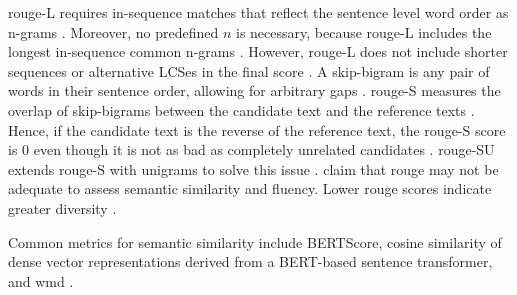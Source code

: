 \ac{rouge}-L requires in-sequence matches that reflect the sentence level word order as n-grams \citep{lin_rouge_2004}.
Moreover, no predefined $n$ is necessary, because \ac{rouge}-L includes the longest in-sequence common n-grams \citep{lin_rouge_2004}.
However, \ac{rouge}-L does not include shorter sequences or alternative LCSes in the final score \citep{lin_rouge_2004}.
A skip-bigram is any pair of words in their sentence order, allowing for arbitrary gaps \citep{lin_rouge_2004}.
\ac{rouge}-S measures the overlap of skip-bigrams between the candidate text and the reference texts \citep{lin_rouge_2004}.
Hence, if the candidate text is the reverse of the reference text, the \ac{rouge}-S score is 0 even though it is not as bad as completely unrelated candidates \citep{lin_rouge_2004}.
\ac{rouge}-SU extends \ac{rouge}-S with unigrams to solve this issue \citep{lin_rouge_2004}.
\citet{kurt_pehlivanoglu_comparative_2024} claim that \ac{rouge} may not be adequate to assess semantic similarity and fluency.
Lower \ac{rouge} scores indicate greater diversity \citep{kurt_pehlivanoglu_comparative_2024}.





Common metrics for semantic similarity include BERTScore, 
cosine similarity of dense vector representations derived from a BERT-based sentence transformer, 
and \ac{wmd} \citep{gohsen_captions_2023}.

